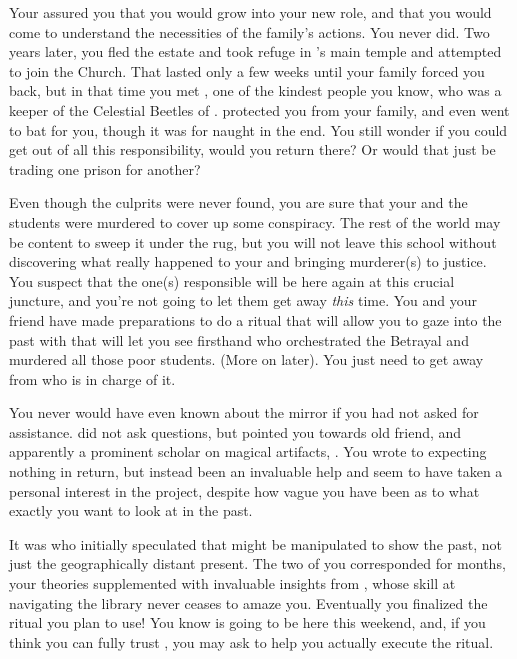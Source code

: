 \documentclass[char]{GL2020}
\begin{document}
Your \cFaledonParent{\parent} assured you that you would grow into your new role, and that you would come to understand the necessities of the family’s actions. You never did. Two years later, you fled the \cHeir{\formal} estate and took refuge in \cTechGod{}’s main temple and attempted to join the Church. That lasted only a few weeks until your family forced you back, but in that time you met \cBeetle{\full}, one of the kindest people you know, who was a keeper of the Celestial Beetles of \cTechGod{}. \cBeetle{\They} protected you from your family, and even went to bat for you, though it was for naught in the end. You still wonder if you could get out of all this responsibility, would you return there? Or would that just be trading one prison for another?

Even though the culprits were never found, you are sure that your \cHeirSibling{\sibling} and the students were murdered to cover up some conspiracy. The rest of the world may be content to sweep it under the rug, but you will not leave this school without discovering what really happened to your \cHeirSibling{\sibling} and bringing \cHeirSibling{\their} murderer(s) to justice. You suspect that the one(s) responsible will be here again at this crucial juncture, and you're not going to let them get away \emph{this} time. You and your friend \cPresident{\full} have made preparations to do a ritual that will allow you to gaze into the past with \iMirror{} that will let you see firsthand who orchestrated the Betrayal and murdered all those poor students. (More on \cPresident{} later). You just need to get \iMirror{} away from \cDiplomat{} who is in charge of it.

You never would have even known about the mirror if you had not asked \cLibrarian{} for assistance.  \cLibrarian{} did not ask questions, but pointed you towards \cLibrarian{\their} old friend, and apparently a prominent scholar on magical artifacts, \cWildCard{\full}.  You wrote to \cWildCard{} expecting nothing in return, but instead \cWildCard{\theyhave} been an invaluable help and seem\cWildCard{\verbs} to have taken a personal interest in the project, despite how vague you have been as to what exactly you want to look at in the past. 

It was \cWildCard{} who initially speculated that \iMirror{} might be manipulated to show the past, not just the geographically distant present. The two of you corresponded for months, your theories supplemented with invaluable insights from \cPresident{}, whose skill at navigating the library never ceases to amaze you. Eventually you finalized the ritual you plan to use! You know \cWildCard{} is going to be here this weekend, and, if you think you can fully trust \cWildCard{}, you may ask \cWildCard{\them} to help you actually execute the ritual.
\end{document}
